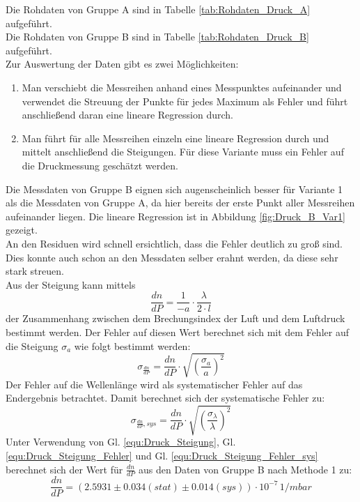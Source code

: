 \documentclass[12pt,a4paper]{article}
\begin{document}
Die Rohdaten von Gruppe A sind in Tabelle \ref{tab:Rohdaten_Druck_A} aufgeführt.\\
Die Rohdaten von Gruppe B sind in Tabelle \ref{tab:Rohdaten_Druck_B} aufgeführt.\\
Zur Auswertung der Daten gibt es zwei Möglichkeiten:
\begin{enumerate}
\item Man verschiebt die Messreihen anhand eines Messpunktes aufeinander und verwendet die Streuung der Punkte für jedes Maximum als Fehler und führt anschließend daran eine lineare Regression durch. 
\item Man führt für alle Messreihen einzeln eine lineare Regression durch und mittelt anschließend die Steigungen. Für diese Variante muss ein Fehler auf die Druckmessung geschätzt werden.
\end{enumerate}
Die Messdaten von Gruppe B eignen sich augenscheinlich besser für Variante 1 als die Messdaten von Gruppe A, da hier bereits der erste Punkt aller Messreihen aufeinander liegen. Die lineare Regression ist in Abbildung \ref{fig:Druck_B_Var1} gezeigt. \\
An den Residuen wird schnell ersichtlich, dass die Fehler deutlich zu groß sind. Dies konnte auch schon an den Messdaten selber erahnt werden, da diese sehr stark streuen.\\
Aus der Steigung kann mittels 
\begin{equation}
\dfrac{dn}{dP} = \dfrac{1}{-a} \cdot \dfrac{\lambda}{2 \cdot l}
\label{equ:Druck_Steigung}
\end{equation}
der Zusammenhang zwischen dem Brechungsindex der Luft und dem Luftdruck bestimmt werden. Der Fehler auf diesen Wert berechnet sich mit dem Fehler auf die Steigung $\sigma _a$ wie folgt bestimmt werden:
\begin{equation}
\sigma _{\frac{dn}{dP}} = \dfrac{dn}{dP} \cdot \sqrt{\left( \dfrac{\sigma_ a}{a} \right) ^2}
\label{equ:Druck_Steigung_Fehler}
\end{equation}
Der Fehler auf die Wellenlänge wird als systematischer Fehler auf das Endergebnis betrachtet. Damit berechnet sich der systematische Fehler zu:
\begin{equation}
\sigma _{\frac{dn}{dP}, sys} = \dfrac{dn}{dP} \cdot \sqrt{\left( \dfrac{\sigma_ \lambda}{\lambda} \right) ^2}
\label{equ:Druck_Steigung_Fehler_sys}
\end{equation}
Unter Verwendung von Gl. \ref{equ:Druck_Steigung}, Gl. \ref{equ:Druck_Steigung_Fehler} und Gl. \ref{equ:Druck_Steigung_Fehler_sys} berechnet sich der Wert für $\frac{dn}{dP}$ aus den Daten von Gruppe B nach Methode 1 zu:
\begin{equation*}
\dfrac{dn}{dP} = (2.5931 \pm 0.034 (stat) \pm 0.014 (sys)) \cdot 10^{-7} \, \si{1/mbar}
\end{equation*}
\end{document}
